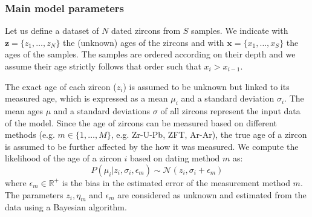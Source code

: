 \documentclass[12pt,letterpaper]{article}
\begin{document}
\begin{flushright}
\end{flushright}
\bigskip
\noindent 

\bigskip
\medskip
\begin{center}

\end{center}

\vspace{1.5in}
\subsubsection{Main model parameters}
Let us define a dataset of $N$ dated zircons from $S$ samples. We indicate with $\mathbf{z} = \{z_1, \dots, z_N\}$ the (unknown) ages of the zircons and with $\mathbf{x} = \{x_1, \dots, x_S\}$ the ages of the samples.
The samples are ordered according on their depth and we assume their age strictly follows that order such that $x_{i} > x_{i - 1}$.

The exact age of each zircon ($z_i$) is assumed to be unknown but linked to its measured age, which is expressed as a mean $\mu_i$ and a standard deviation $\sigma_i$.
The mean ages $\mu$ and a standard deviations $\sigma$ of all zircons represent the input data of the model.
Since the age of zircons can be measured based on different methods (e.g. $m \in \{1, \dots, M \}$, e.g. Zr-U-Pb, ZFT, Ar-Ar), the true age of a zircon is assumed to be further affected by the how it was measured. We compute the likelihood of the age of a zircon $i$ based on dating method $m$ as:
\begin{equation}
P(\mu_i | z_i, \sigma_i, \epsilon_m) \sim \mathcal{N}(z_i, \sigma_i + \epsilon_m)   
\end{equation}
where 
 $\epsilon_m \in \mathbb{R^+}$ is the bias in the estimated error of the measurement method $m$.
The parameters  $z_i, \eta_m$ and $\epsilon_m$ are considered as unknown and estimated from the data using a Bayesian algorithm.
\end{document}
